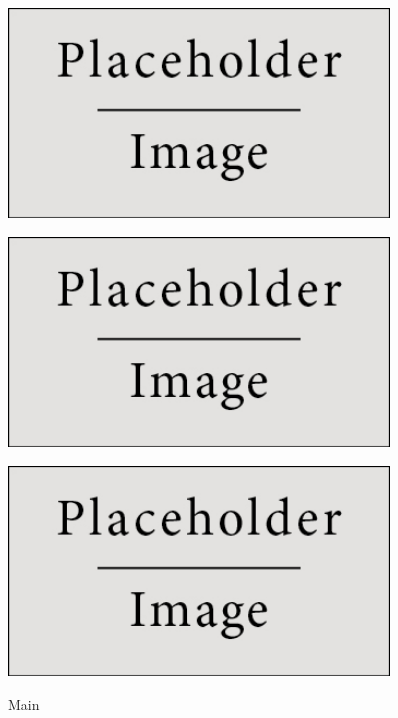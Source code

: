 \documentclass[11pt,twoside,a4paper]{report}
\begin{document}
\begin{figure}[H]
	\centering
	\begin{minipage}{.5\textwidth}
		\begin{center}
			\includegraphics[width=0.9\textwidth]{placeholder} %
			\label{fig:consultas4}
		\end{center}
	\end{minipage}%
	\begin{minipage}{.5\textwidth}
		\begin{center}
			\includegraphics[width=0.9\textwidth]{placeholder} %
			\label{fig:consultas5}
		\end{center}
	\end{minipage}
	\begin{minipage}{.5\textwidth}
		\begin{center}
			\includegraphics[width=0.9\textwidth]{placeholder} %
			\label{fig:consultas6}
		\end{center}
	\end{minipage}
	\caption{Main}
	\label{fig:consultas3}
\end{figure}
\end{document}

